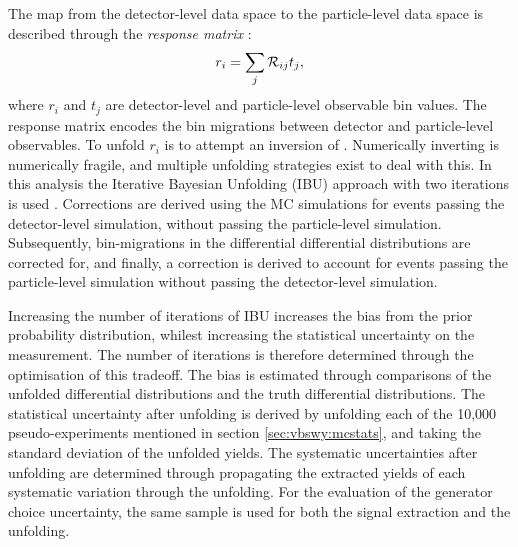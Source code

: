 

The map from the detector-level data space to the particle-level data space is described through the \textit{response matrix} \rij:
\begin{equation}
  r_i=\sum_{j}\mathcal{R}_{ij} t_j,
\end{equation} 
where $r_i$ and $t_j$ are detector-level and particle-level observable bin values. The response matrix encodes the bin migrations between detector and particle-level observables. To unfold $r_i$ is to attempt an inversion of \rij. Numerically inverting \rij is numerically fragile, and multiple unfolding strategies exist to deal with this. In this analysis the Iterative Bayesian Unfolding (IBU) approach with two iterations is used \cite{VBSWy:IBU}. Corrections are derived using the MC simulations for events passing the detector-level simulation, without passing the particle-level simulation. Subsequently, bin-migrations in the differential differential distributions are corrected for, and finally, a correction is derived to account for events passing the particle-level simulation without passing the detector-level simulation.

Increasing the number of iterations of IBU increases the bias from the prior probability distribution, whilest increasing the statistical uncertainty on the measurement. The number of iterations is therefore determined through the optimisation of this tradeoff. The bias is estimated through comparisons of the unfolded differential distributions and the truth \ewwy differential distributions. The statistical uncertainty after unfolding is derived by unfolding each of the 10,000 pseudo-experiments mentioned in section \ref{sec:vbswy:mcstats}, and taking the standard deviation of the unfolded yields. The systematic uncertainties after unfolding are determined through propagating the extracted \ewwy yields of each systematic variation through the unfolding. For the evaluation of the \ewwy generator choice uncertainty, the same \MADGRAPH \ewwy sample is used for both the signal extraction and the unfolding.

